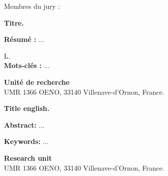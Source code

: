 \vfill

Membres du jury :
\begin{table}[b]
\centering
{}
\end{table}

\thispagestyle{empty}
\vfill
\newpage
\blankpage

\begin{small}
\linespread{1.05}\selectfont
\begin{center}
\textbf{Titre.}
\end{center}

\textbf{Résumé :} 
...

L.\newline
\\
\textbf{Mots-clés :} ... \\

\vspace{0.4cm}
\noindent\makebox[\linewidth]{\rule{\textwidth}{0.4pt}}

\vfill
\begin{center}
\textbf{Unité de recherche} \\
UMR 1366 OENO, 33140 Villenave-d'Ornon, France.
\end{center}
\newpage
\blankpage

\linespread{1.05}\selectfont
\begin{center}
\textbf{Title english.}
\end{center}

\textbf{Abstract:} 
...

\textbf{Keywords:} ...

\vspace{0.4cm}
\noindent\makebox[\linewidth]{\rule{\textwidth}{0.4pt}}

\vfill
\begin{center}
\textbf{Research unit} \\
UMR 1366 OENO, 33140 Villenave-d'Ornon, France.
\end{center}
\end{small}
